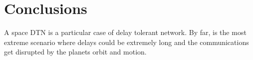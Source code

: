 \section{Conclusions}
\label{sec:con}

A space DTN is a particular case of delay tolerant network. By far, is the most extreme scenario where delays could be extremely long and the communications get disrupted by the planets orbit and motion.